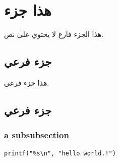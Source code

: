 \section{هذا جزء}

هذا الجزء فارغ لا يحتوي على نص.

\subsection{جزء فرعي}

هذا جزء فرعي.
\subsection{جزء فرعي}
\subsubsection{\textenglish{a subsubsection}}

\begin{english}
\begin{verbatim}
printf("%s\n", "hello world.!")
\end{verbatim}
\end{english}
